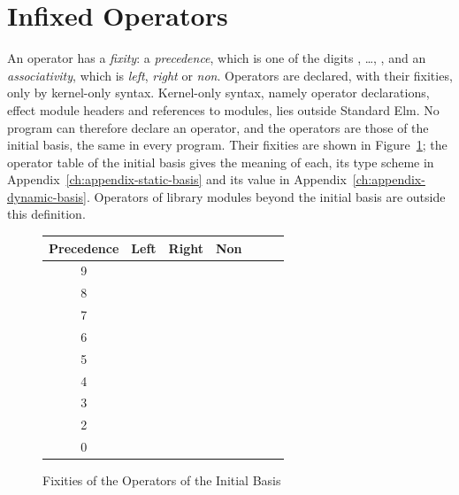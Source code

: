 \section{Infixed Operators}\label{sec:syntax-core-infix}

An operator \opv{} has a \emph{fixity}: a \emph{precedence}, which is one of
the digits , \ldots, , and an \emph{associativity}, which is
\emph{left}, \emph{right} or \emph{non}. Operators are declared, with their
fixities, only by kernel-only syntax. Kernel-only syntax, namely operator
declarations, effect module headers and references to 
modules, lies outside Standard Elm.
No program can therefore declare an operator, and the operators are those of
the initial basis, the same in every program. Their fixities are shown in
Figure~\ref{fig:core-fixities}; the operator table of the initial basis gives
the meaning of each, its type scheme in
Appendix~\ref{ch:appendix-static-basis} and its value in
Appendix~\ref{ch:appendix-dynamic-basis}. Operators of library modules beyond
the initial basis are outside this definition.

\begin{figure}[tbp]
\centering
\begin{tabular}{@{}clll@{}}
Precedence & Left & Right & Non\\
\hline
9 & \kw{<{}<} & \kw{>{}>} & \\
8 & & \kw{\textasciicircum} & \\
7 & \kw{*}\ \ \kw{/}\ \ \kw{//} & & \\
6 & \kw{+}\ \ \kw{-} & & \\
5 & & \kw{++}\ \ \kw{::} & \\
4 & & & \kw{==}\ \ \kw{/=}\ \ \kw{<}\ \ \kw{>}\ \ \kw{<=}\ \ \kw{>=}\\
3 & & \kw{\&\&} & \\
2 & & \kw{||} & \\
0 & \kw{|>} & \kw{<|} &
\end{tabular}
\caption{Fixities of the Operators of the Initial Basis}\label{fig:core-fixities}
\end{figure}


